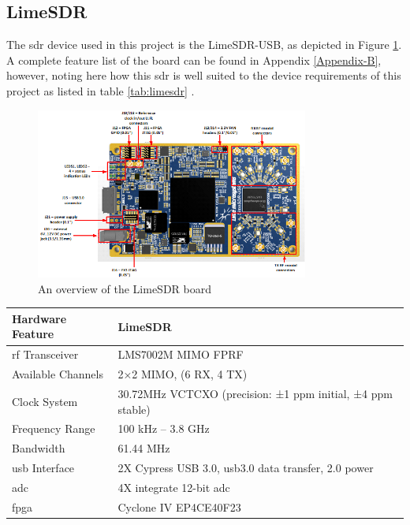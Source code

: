 \documentclass[class=report,11pt,crop=false]{standalone}
\begin{document}
\subsection{LimeSDR}
The \gls{sdr} device used in this project is the LimeSDR-USB, as depicted in Figure \ref{fig:lime-board}. A complete feature list of the board can be found in Appendix \ref{Appendix-B}, however, noting here how this \gls{sdr} is well suited to the device requirements of this project as listed in table \ref{tab:limesdr} \cite{myriad}.

\begin{figure}[h]
    \centering
    \includegraphics[width=0.8\textwidth]{Images/diagrams/LimeSDR-USB.png}
    \caption{An overview of the LimeSDR board}
    \label{fig:lime-board}
\end{figure}

\begin{center}
    \begin{tabular}{|p{} | p{}|}
        \hline
        \textbf{Hardware Feature} & \textbf{LimeSDR} \\
        \hline
        \hline
        \gls{rf} Transceiver & LMS7002M MIMO FPRF \\
        \hline
        Available Channels & 2×2 MIMO, (6 RX, 4 TX) \\
        \hline
        Clock System & 30.72MHz VCTCXO (precision: ±1 ppm initial, ±4 ppm stable) \\
        \hline
        Frequency Range & 100 kHz – 3.8 GHz\\
        \hline
        Bandwidth & 61.44 MHz \\
        \hline
        \gls{usb} Interface & 2X Cypress USB 3.0, \gls{usb}3.0 data transfer, 2.0 power \\
        \hline
        \gls{adc} & 4X integrate 12-bit \gls{adc}\\
        \hline
        \gls{fpga} & Cyclone IV EP4CE40F23\\
        \hline
    \end{tabular}
\end{center}
\end{document}
